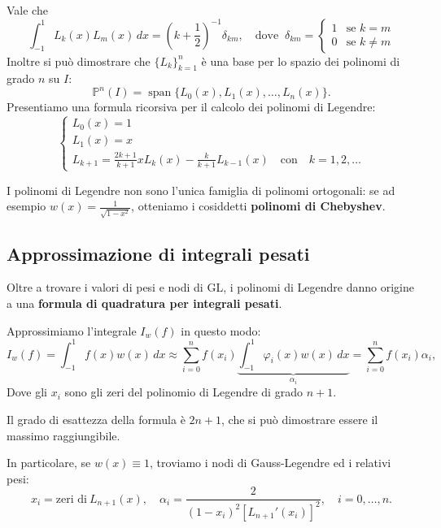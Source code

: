 Vale che
\[
\int_{-1}^{1} L_k(x) L_m(x) \, dx = \left(k + \frac{1}{2} \right)^{-1} \delta_{km},\quad \text{dove } \ \delta_{km}=\begin{cases}
    1&\text{se }k=m\\
    0&\text{se }k\ne m
\end{cases}
\]
Inoltre si può dimostrare che $\{L_k\}_{k=1}^n$ è una base per lo spazio dei polinomi di grado $n$ su $I$:
\begin{equation*}
\mathbb{P}^{n}(I) =\operatorname{span}\{L_{0}(x) ,L_{1}(x) ,\dotsc ,L_{n}(x)\} .
\end{equation*}
Presentiamo una formula ricorsiva per il calcolo dei polinomi di Legendre:
\begin{equation*}
\begin{cases}
L_{0}(x) =1\\
L_{1}(x) =x\\
L_{k+1} =\frac{2k+1}{k+1} xL_{k}(x) -\frac{k}{k+1} L_{k-1}(x) \quad \text{con} \quad k=1,2,\dots
\end{cases}
\end{equation*}

I polinomi di Legendre non sono l'unica famiglia di polinomi ortogonali: se ad esempio $w(x)=\frac{1}{\sqrt{1-x^2}}$, otteniamo i cosiddetti \textbf{polinomi di Chebyshev}.

\subsection{Approssimazione di integrali pesati}
Oltre a trovare i valori di pesi e nodi di GL, i polinomi di Legendre danno origine a una \textbf{formula di quadratura per integrali pesati}.

Approssimiamo l'integrale $I_w(f)$ in questo modo:
\[
I_w(f)=\int_{-1}^1f(x)w(x)\,dx\approx \sum_{i=0}^n f(x_i)\underbrace{\int_{-1}^1\varphi_i(x) w(x)\,dx}_{\alpha_i}=\sum _{i=0}^nf(x_i)\alpha_i,
\]
Dove gli $x_i$ sono gli zeri del polinomio di Legendre di grado $n+1$.

Il grado di esattezza della formula è $2n+1$, che si può dimostrare essere il massimo raggiungibile.

In particolare, se $w(x)\equiv 1$, troviamo i nodi di Gauss-Legendre ed i relativi pesi:
\begin{equation}
x_{i} = \text{zeri di} \ L_{n+1}(x) ,\quad \alpha _{i} =\frac{2}{( 1-x_{i})^{2}[ L_{n+1} '( x_{i})]^{2}} ,\quad i=0,\dotsc ,n.
\label{eq:nodi-gl}
\end{equation}



